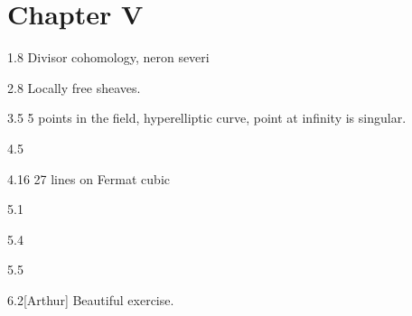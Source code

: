 \chapter{Chapter V}

\begin{manualexercise}{1.8}
	Divisor cohomology, neron severi
\end{manualexercise}

\begin{manualexercise}{2.8}
	Locally free sheaves.
\end{manualexercise}

\begin{manualexercise}{3.5}
	5 points in the field, hyperelliptic curve, point at infinity is singular.
\end{manualexercise}

\begin{manualexercise}{4.5}
	
\end{manualexercise}

\begin{manualexercise}{4.16}
	27 lines on Fermat cubic
\end{manualexercise}

\begin{manualexercise}{5.1}
	
\end{manualexercise}

\begin{manualexercise}{5.4}
	
\end{manualexercise}

\begin{manualexercise}{5.5}
	
\end{manualexercise}

\begin{manualexercise}{6.2}[Arthur]
	Beautiful exercise.
\end{manualexercise}


